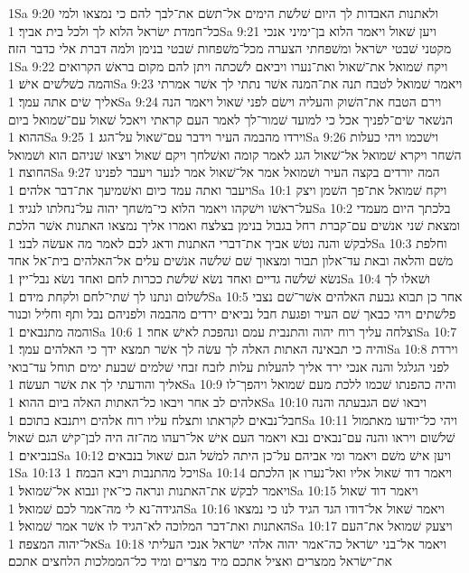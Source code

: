 1Sa 9:20  ולאתנות האבדות לך היום שׁלשׁת הימים אל־תשׂם את־לבך להם כי נמצאו ולמי כל־חמדת ישׂראל הלוא לך ולכל בית אביך׃
1Sa 9:21  ויען שׁאול ויאמר הלוא בן־ימיני אנכי מקטני שׁבטי ישׂראל ומשׁפחתי הצערה מכל־משׁפחות שׁבטי בנימן ולמה דברת אלי כדבר הזה׃
1Sa 9:22  ויקח שׁמואל את־שׁאול ואת־נערו ויביאם לשׁכתה ויתן להם מקום בראשׁ הקרואים והמה כשׁלשׁים אישׁ׃
1Sa 9:23  ויאמר שׁמואל לטבח תנה את־המנה אשׁר נתתי לך אשׁר אמרתי אליך שׂים אתה עמך׃
1Sa 9:24  וירם הטבח את־השׁוק והעליה וישׂם לפני שׁאול ויאמר הנה הנשׁאר שׂים־לפניך אכל כי למועד שׁמור־לך לאמר העם קראתי ויאכל שׁאול עם־שׁמואל ביום ההוא׃
1Sa 9:25  וירדו מהבמה העיר וידבר עם־שׁאול על־הגג׃
1Sa 9:26  וישׁכמו ויהי כעלות השׁחר ויקרא שׁמואל אל־שׁאול הגג לאמר קומה ואשׁלחך ויקם שׁאול ויצאו שׁניהם הוא ושׁמואל החוצה׃
1Sa 9:27  המה יורדים בקצה העיר ושׁמואל אמר אל־שׁאול אמר לנער ויעבר לפנינו ויעבר ואתה עמד כיום ואשׁמיעך את־דבר אלהים׃
1Sa 10:1  ויקח שׁמואל את־פך השׁמן ויצק על־ראשׁו וישׁקהו ויאמר הלוא כי־משׁחך יהוה על־נחלתו לנגיד׃
1Sa 10:2  בלכתך היום מעמדי ומצאת שׁני אנשׁים עם־קברת רחל בגבול בנימן בצלצח ואמרו אליך נמצאו האתנות אשׁר הלכת לבקשׁ והנה נטשׁ אביך את־דברי האתנות ודאג לכם לאמר מה אעשׂה לבני׃
1Sa 10:3  וחלפת משׁם והלאה ובאת עד־אלון תבור ומצאוך שׁם שׁלשׁה אנשׁים עלים אל־האלהים בית־אל אחד נשׂא שׁלשׁה גדיים ואחד נשׂא שׁלשׁת ככרות לחם ואחד נשׂא נבל־יין׃
1Sa 10:4  ושׁאלו לך לשׁלום ונתנו לך שׁתי־לחם ולקחת מידם׃
1Sa 10:5  אחר כן תבוא גבעת האלהים אשׁר־שׁם נצבי פלשׁתים ויהי כבאך שׁם העיר ופגעת חבל נביאים ירדים מהבמה ולפניהם נבל ותף וחליל וכנור והמה מתנבאים׃
1Sa 10:6  וצלחה עליך רוח יהוה והתנבית עמם ונהפכת לאישׁ אחר׃
1Sa 10:7  והיה כי תבאינה האתות האלה לך עשׂה לך אשׁר תמצא ידך כי האלהים עמך׃
1Sa 10:8  וירדת לפני הגלגל והנה אנכי ירד אליך להעלות עלות לזבח זבחי שׁלמים שׁבעת ימים תוחל עד־בואי אליך והודעתי לך את אשׁר תעשׂה׃
1Sa 10:9  והיה כהפנתו שׁכמו ללכת מעם שׁמואל ויהפך־לו אלהים לב אחר ויבאו כל־האתות האלה ביום ההוא׃
1Sa 10:10  ויבאו שׁם הגבעתה והנה חבל־נבאים לקראתו ותצלח עליו רוח אלהים ויתנבא בתוכם׃
1Sa 10:11  ויהי כל־יודעו מאתמול שׁלשׁום ויראו והנה עם־נבאים נבא ויאמר העם אישׁ אל־רעהו מה־זה היה לבן־קישׁ הגם שׁאול בנביאים׃
1Sa 10:12  ויען אישׁ משׁם ויאמר ומי אביהם על־כן היתה למשׁל הגם שׁאול בנבאים׃
1Sa 10:13  ויכל מהתנבות ויבא הבמה׃
1Sa 10:14  ויאמר דוד שׁאול אליו ואל־נערו אן הלכתם ויאמר לבקשׁ את־האתנות ונראה כי־אין ונבוא אל־שׁמואל׃
1Sa 10:15  ויאמר דוד שׁאול הגידה־נא לי מה־אמר לכם שׁמואל׃
1Sa 10:16  ויאמר שׁאול אל־דודו הגד הגיד לנו כי נמצאו האתנות ואת־דבר המלוכה לא־הגיד לו אשׁר אמר שׁמואל׃
1Sa 10:17  ויצעק שׁמואל את־העם אל־יהוה המצפה׃
1Sa 10:18  ויאמר אל־בני ישׂראל כה־אמר יהוה אלהי ישׂראל אנכי העליתי את־ישׂראל ממצרים ואציל אתכם מיד מצרים ומיד כל־הממלכות הלחצים אתכם׃
